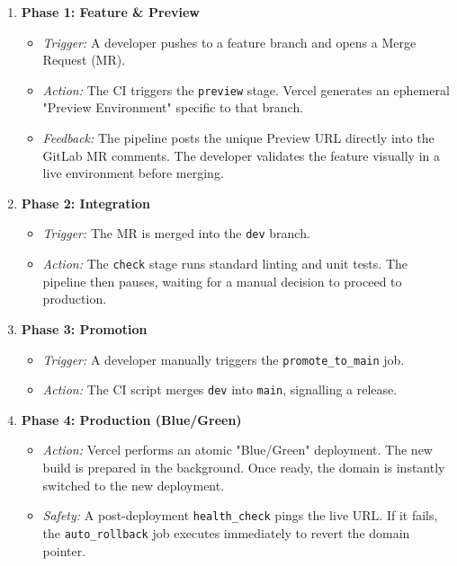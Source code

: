 \documentclass[a4paper,12pt]{report}
\begin{document}
\begin{enumerate}
    \item \textbf{Phase 1: Feature \& Preview}
    \begin{itemize}[label=-]
        \item \textit{Trigger:} A developer pushes to a feature branch and opens a Merge Request (MR).
        \item \textit{Action:} The CI triggers the \texttt{preview} stage. Vercel generates an ephemeral "Preview Environment" specific to that branch.
        \item \textit{Feedback:} The pipeline posts the unique Preview URL directly into the GitLab MR comments. The developer validates the feature visually in a live environment before merging.
    \end{itemize}

    \item \textbf{Phase 2: Integration}
    \begin{itemize}[label=-]
        \item \textit{Trigger:} The MR is merged into the \texttt{dev} branch.
        \item \textit{Action:} The \texttt{check} stage runs standard linting and unit tests. The pipeline then pauses, waiting for a manual decision to proceed to production.
    \end{itemize}

    \item \textbf{Phase 3: Promotion}
    \begin{itemize}[label=-]
        \item \textit{Trigger:} A developer manually triggers the \texttt{promote\_to\_main} job.
        \item \textit{Action:} The CI script merges \texttt{dev} into \texttt{main}, signalling a release.
    \end{itemize}

    \item \textbf{Phase 4: Production (Blue/Green)}
    \begin{itemize}[label=-]
        \item \textit{Action:} Vercel performs an atomic "Blue/Green" deployment. The new build is prepared in the background. Once ready, the domain is instantly switched to the new deployment.
        \item \textit{Safety:} A post-deployment \texttt{health\_check} pings the live URL. If it fails, the \texttt{auto\_rollback} job executes immediately to revert the domain pointer.
    \end{itemize}
\end{enumerate}
\end{document}
